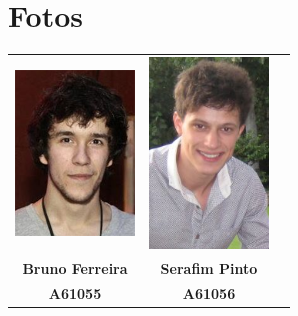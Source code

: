 \documentclass[a5paper,onecolumn, 11pt]{article}
\begin{document}
\clearpage
\onecolumn
\section{Fotos}
\begin{center}
    \begin{tabular}{ccc}
        \includegraphics[width=90pt]{bruno.png}&
        \includegraphics[width=90pt]{serafim.png}\\
        
        \small{\textbf{Bruno Ferreira}}&
        \small{\textbf{Serafim Pinto}}\\
        \small{\textbf{A61055}}&
        \small{\textbf{A61056}}\\
    \end{tabular}
\end{center}
\end{document}
